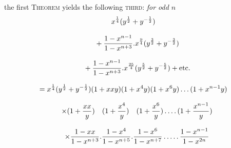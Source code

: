 the first \textsc{Theorem} yields the following \textsc{third}: \textit{for odd $n$}
\[
\begin{gathered}
x^{\frac14}(y^{\frac12}+y^{-\frac12})
\\[8pt]\quad{}+\frac{1-x^{n-1}}{1-x^{n+3}}.x^{\frac94}(y^{\frac32}+y^{-\frac32})
\\[8pt]\quad{}+\frac{1-x^{n-1}}{1-x^{n+3}}.x^{\frac{25}4}(y^{\frac52}+y^{-\frac52})+\text{etc.}\\[8pt]
=x^{\frac14}(y^{\frac12}+y^{-\frac12})(1+xxy)(1+x^4y)(1+x^6y)\mathinner{.\,.\,.}(1+x^{n-1}y)\\[8pt]
\quad\times(1+\frac{xx}y)\quad(1+\frac{x^4}y)\quad(1+\frac{x^6}y)\mathinner{.\,.\,.\,.}(1+\frac{x^{n-1}}y)\\[8pt]
\quad\times\frac{1-xx}{1-x^{n+3}}.\frac{1-x^4}{1-x^{n+5}}.\frac{1-x^6}{1-x^{n+7}}\mathinner{.\,.\,.\,.\,.}\frac{1-x^{n-1}}{1-x^{2n}}
\end{gathered}
\]
\clearpage
\endgroup
